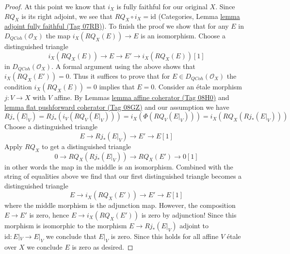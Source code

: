 \documentclass{amsart}
\theoremstyle{plain}
\theoremstyle{definition}
\theoremstyle{remark}
\numberwithin{equation}{subsection}
\def\QCoh{\mathit{QCoh}}
\begin{document}
\begin{proof}
\medskip\noindent
At this point we know that $i_X$ is fully faithful for our original $X$.
Since $RQ_X$ is its right adjoint, we see that
$RQ_X \circ i_X = \text{id}$ (Categories, Lemma
\href{https://stacks.math.columbia.edu/tag/07RB}{lemma adjoint fully faithful (Tag 07RB)}).
To finish the proof we show that for any
$E$ in $D_\QCoh(\mathcal{O}_X)$ the map
$i_X(RQ_X(E)) \to E$ is an isomorphism. Choose a distinguished triangle
$$
i_X(RQ_X(E)) \to E \to E' \to i_X(RQ_X(E))[1]
$$
in $D_\QCoh(\mathcal{O}_X)$. A formal argument using the
above shows that $i_X(RQ_X(E')) = 0$. Thus it suffices to prove that
for $E \in D_\QCoh(\mathcal{O}_X)$ the condition
$i_X(RQ_X(E)) = 0$ implies that $E = 0$. Consider an \'etale morphism
$j : V \to X$ with $V$ affine. By
Lemmas \href{https://stacks.math.columbia.edu/tag/08H0}{lemma affine coherator (Tag 08H0)} and
\href{https://stacks.math.columbia.edu/tag/08GZ}{lemma flat pushforward coherator (Tag 08GZ)}
and our assumption we have
$$
Rj_*(E|_V) = Rj_*(i_V(RQ_V(E|_V))) = i_X(\Phi(RQ_V(E|_V))) =
i_X(RQ_X(Rj_*(E|_V)))
$$
Choose a distinguished triangle
$$
E \to Rj_*(E|_V) \to E' \to E[1]
$$
Apply $RQ_X$ to get a distinguished triangle
$$
0 \to RQ_X(Rj_*(E|_V)) \to RQ_X(E') \to 0[1]
$$
in other words the map in the middle is an isomorphism.
Combined with the string of equalities above we find
that our first distinguished triangle becomes a distinguished triangle
$$
E \to i_X(RQ_X(E')) \to E' \to E[1]
$$
where the middle morphism is the adjunction map. However, the composition
$E \to E'$ is zero, hence $E \to i_X(RQ_X(E'))$ is zero by adjunction!
Since this morphism is isomorphic to the morphism
$E \to Rj_*(E|_V)$ adjoint to $\text{id} : E|_V \to E|_V$ we
conclude that $E|_V$ is zero. Since this holds for all
affine $V$ \'etale over $X$ we conclude $E$ is zero as desired.
\end{proof}
\end{document}
